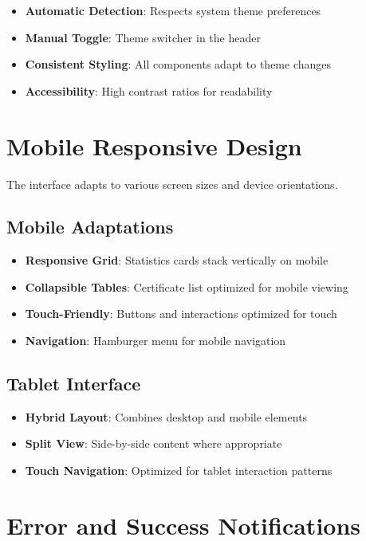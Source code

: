 \begin{itemize}
    \item \textbf{Automatic Detection}: Respects system theme preferences
    \item \textbf{Manual Toggle}: Theme switcher in the header
    \item \textbf{Consistent Styling}: All components adapt to theme changes
    \item \textbf{Accessibility}: High contrast ratios for readability
\end{itemize}

\section{Mobile Responsive Design}

The interface adapts to various screen sizes and device orientations.

\subsection{Mobile Adaptations}

\begin{itemize}
    \item \textbf{Responsive Grid}: Statistics cards stack vertically on mobile
    \item \textbf{Collapsible Tables}: Certificate list optimized for mobile viewing
    \item \textbf{Touch-Friendly}: Buttons and interactions optimized for touch
    \item \textbf{Navigation}: Hamburger menu for mobile navigation
\end{itemize}

\subsection{Tablet Interface}

\begin{itemize}
    \item \textbf{Hybrid Layout}: Combines desktop and mobile elements
    \item \textbf{Split View}: Side-by-side content where appropriate
    \item \textbf{Touch Navigation}: Optimized for tablet interaction patterns
\end{itemize}

\section{Error and Success Notifications}

